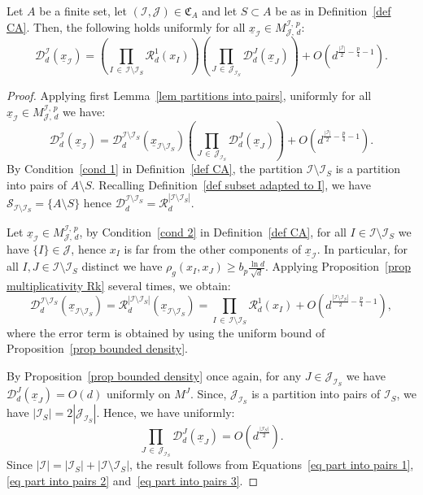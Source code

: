\documentclass[AHL,Unicode,longabstracts,published]{cedram}
\newcommand{\D}{\mathcal{D}}
\newcommand{\I}{\mathcal{I}}
\newcommand{\J}{\mathcal{J}}
\newcommand{\clR}{\mathcal{R}}
\newcommand{\clS}{\mathcal{S}}
\newcommand{\frkC}{\mathfrak{C}}
\newcommand{\norm}[1]{\left\lvert #1 \right\rvert}
\renewcommand{\geq}{\geqslant}
\begin{document}
\begin{lemm}\label{lem partitions into pairs 2}
Let $A$ be a finite set, let $(\I,\J) \in \frkC_A$ and let $S \subset A$ be as in Definition~\ref{def CA}. Then, the following holds uniformly for all $\underline{x}_\I \in M^{\I,\,p}_{\J,\,d}$:
\[
\D_d^\I\left(\underline{x}_\I\right) = \left(\prod_{I\,\in\,\I \setminus \I_S} \clR_d^1\left(x_I\right)\right) \left(\prod_{J\, \in\,\J_{\I_S}}\D_d^J\left(\underline{x}_J\right)\right) +O\left(d^{\frac{\norm{\I}}{2}-\frac{p}{4}-1}\right).
\]
\end{lemm}

\begin{proof}
Applying first Lemma~\ref{lem partitions into pairs}, uniformly for all $\underline{x}_\I \in M^{\I,\,p}_{\J,\,d}$ we have:
\begin{equation}\label{eq part into pairs 1}
\D_d^\I\left(\underline{x}_\I\right) = \D_d^{\I \setminus \I_S}\left(\underline{x}_{\I \setminus \I_S}\right) \left(\prod_{J\, \in\,\J_{\I_S}}\D_d^J\left(\underline{x}_J\right)\right) +O\left(d^{\frac{\norm{\I}}{2}-\frac{p}{4}-1}\right).
\end{equation}
By Condition~\eqref{cond 1} in Definition~\ref{def CA}, the partition $\I \setminus \I_S$ is a partition into pairs of $A \setminus S$. Recalling Definition~\ref{def subset adapted to I}, we have $\clS_{\I \setminus \I_S} = \{A \setminus S\}$ hence $\D_d^{\I \setminus \I_S} = \clR_d^{|\I \setminus \I_S|}$.

Let $\underline{x}_\I \in M^{\I,\,p}_{\J,\,d}$, by Condition~\eqref{cond 2} in Definition~\ref{def CA}, for all $I \in \I \setminus \I_S$ we have $\{I\} \in \J$, hence $x_I$ is far from the other components of $\underline{x}_\I$. In particular, for all $I,J \in \I \setminus \I_S$ distinct we have $\rho_g(x_I,x_J) \geq b_p \tfrac{\ln d}{\sqrt{d}}$. Applying Proposition~\ref{prop multiplicativity Rk} several times, we obtain:
\begin{equation}\label{eq part into pairs 2}
\D_d^{\I \setminus \I_S}\left(\underline{x}_{\I \setminus \I_S}\right) = \clR_d^{\norm{\I \setminus \I_S}}\left(\underline{x}_{\I \setminus \I_S}\right) = \prod_{I\,\in\,\I \setminus \I_S} \clR_d^1(x_I) + O\left(d^{\frac{\norm{\I \setminus \I_S}}{2}-\frac{p}{4}-1}\right),
\end{equation}
where the error term is obtained by using the uniform bound of Proposition~\ref{prop bounded density}.

By Proposition~\ref{prop bounded density} once again, for any $J \in \J_{\I_S}$ we have $\D_d^J(\underline{x}_J) = O(d)$ uniformly on $M^J$. Since, $\J_{\I_S}$ is a partition into pairs of $\I_S$, we have $|\I_S| = 2|\J_{\I_S}|$. Hence, we have uniformly:
\begin{equation}\label{eq part into pairs 3}
\prod_{J\,\in\,\J_{\I_S}}\D_d^J\left(\underline{x}_J\right) = O\left(d^\frac{\norm{\I_S}}{2}\right).
\end{equation}
Since $|\I| = |\I_S| + |\I \setminus \I_S|$, the result follows from Equations~\eqref{eq part into pairs 1}, \eqref{eq part into pairs 2} and~\eqref{eq part into pairs 3}.
\end{proof}
\end{document}
